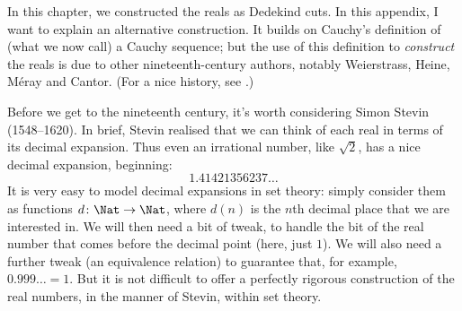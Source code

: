 \documentclass[../../../include/open-logic-section]{subfiles}
\begin{document}
	
	
In this chapter, we constructed the reals as Dedekind cuts. In this appendix, I want to explain an alternative construction. It builds on Cauchy's definition of (what we now call) a Cauchy sequence; but the use of this definition to \emph{construct} the reals is due to other nineteenth-century authors, notably Weierstrass, Heine, M\'{e}ray and Cantor. (For a nice history, see \citeauthor{OConnorRobertson:RN} \citeyear{OConnorRobertson:RN}.)

Before we get to the nineteenth century, it's worth considering Simon Stevin (1548--1620). In brief, Stevin realised that we can think of each real in terms of its decimal expansion. Thus even an irrational number, like $\sqrt{2}$, has a nice decimal expansion, beginning:
	$$1.41421356237\ldots$$
It is very easy to model decimal expansions in set theory: simply consider them as functions $d \colon \Nat \to \Nat$, where $d(n)$ is the $n$th decimal place that we are interested in. We will then need a bit of tweak, to handle the bit of the real number that comes before the decimal point (here, just $1$). We will also need a further tweak (an equivalence relation) to guarantee that, for example, $0.999\ldots = 1$. But it is not difficult to offer a perfectly rigorous construction of the real numbers, in the manner of Stevin, within set theory. 
\end{document}
